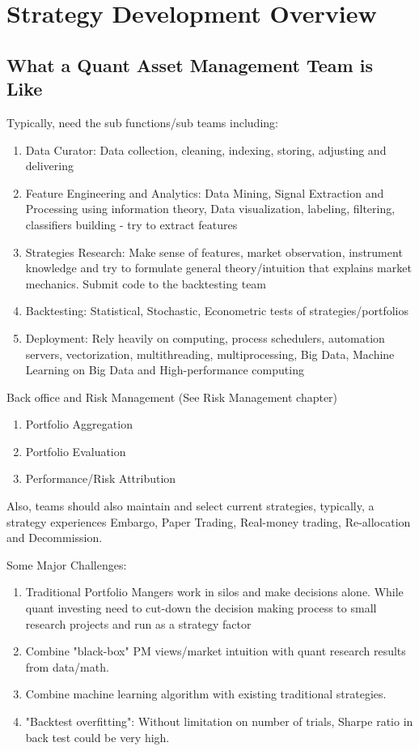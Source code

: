 \documentclass[11pt, openany]{book}              %
\begin{document}
\chapter{Strategy Development Overview}

\section{What a Quant Asset Management Team is Like}

Typically, need the sub functions/sub teams including:

\begin{enumerate}
 \item Data Curator: Data collection, cleaning, indexing, storing, adjusting and delivering 
 \item Feature Engineering and Analytics: Data Mining, Signal Extraction and Processing using information theory, Data visualization, labeling, filtering, classifiers building - try to extract features
 \item Strategies Research: Make sense of features, market observation, instrument knowledge and try to formulate general theory/intuition that explains market mechanics. Submit code to the backtesting team
 \item Backtesting: Statistical, Stochastic, Econometric tests of strategies/portfolios
 \item Deployment: Rely heavily on computing, process schedulers, automation servers, vectorization, multithreading, multiprocessing, Big Data, Machine Learning on Big Data and High-performance computing 
\end{enumerate}

Back office and Risk Management (See Risk Management chapter)

\begin{enumerate}
 \item Portfolio Aggregation
 \item Portfolio Evaluation
 \item Performance/Risk Attribution
\end{enumerate}

Also, teams should also maintain and select current strategies, typically, a strategy experiences Embargo, Paper Trading, Real-money trading, Re-allocation and Decommission.

Some Major Challenges:

\begin{enumerate}
 \item Traditional Portfolio Mangers work in silos and make decisions alone. While quant investing need to cut-down the decision making process to small research projects and run as a strategy factor
 \item Combine "black-box" PM views/market intuition with quant research results from data/math. 
 \item Combine machine learning algorithm with existing traditional strategies. 	
 \item "Backtest overfitting": Without limitation on number of trials, Sharpe ratio in back test could be very high. 
\end{enumerate}
\end{document}
